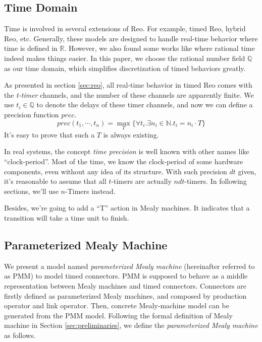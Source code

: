 \documentclass[conference, a4paper]{IEEEtran}
\begin{document}
\subsection{Time Domain}
Time is involved in several extensions of Reo. For example, timed
Reo\cite{DBLP:conf/sefm/ArbabBBR04}, hybrid Reo\cite{DBLP:conf/icfem/ChenSS14}, etc.
Generally, these models are designed to handle real-time behavior where time is defined in
$\mathbb{R}$. However, we also found some works like \cite{DBLP:journals/fmsd/PrabhakarDM015} where
rational time indeed  makes things easier. In this paper, we choose the rational number field
$\mathbb{Q}$ as our time domain, which simplifies discretization of timed behaviors greatly.

As presented in section \ref{sec:reo}, all real-time behavior in timed Reo comes with the
\emph{t-timer} channels, and the number of these channels are apparently finite. We use
$t_i\in\mathbb{Q}$ to denote the delays of these timer channels, and now we can define a precision
function $prec$.
\[
prec(t_1,\cdots,t_n) = \max_T\{\forall t_i.\exists n_i\in\mathbb{N}.t_i=n_i\cdot T\}
\]
It's easy to prove that such a $T$ is always existing.

In real systems, the concept \emph{time precision} is well known with other names like ``clock-period''.
Most of the time, we know the clock-period of some hardware components, even without any idea of its
structure. With such precision $dt$ given, it's reasonable to assume that all $t$-timers are actually
$ndt$-timers. In following sections, we'll use $n$-Timers instead.

Besides, we're going to add a ``T'' action in Mealy machines. It indicates that a transition
will take a time unit to finish.

\subsection{Parameterized Mealy Machine}
We present a model named \emph{parameterized Mealy machine} (hereinafter referred to as PMM)
to model timed connectors. PMM is supposed to behave as a middle representation between Mealy
machines and timed connectors. Connectors are firstly defined as parameterized Mealy machines, and
composed by production operator and link operator. Then, concrete Mealy-machine model can be
generated from the PMM model.
Following the formal definition of Mealy machine in Section \ref{sec:preliminaries}, we define the
\emph{parameterized Mealy machine} as follows. 
\end{document}

